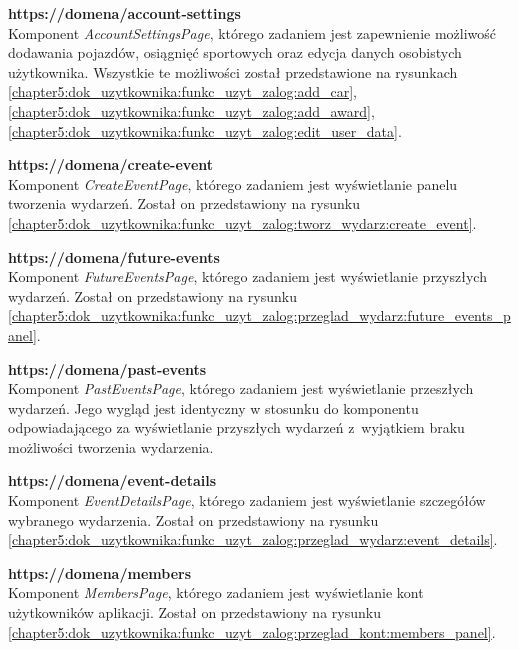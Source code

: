\documentclass[../Kamil_Kowalewski_Main.tex]{subfiles}
\begin{document}
{{{{                \noindent\textbf{https://domena/account-settings}\\
                \indent Komponent \textit{AccountSettingsPage}, którego zadaniem jest
                zapewnienie możliwość dodawania pojazdów, osiągnięć sportowych oraz edycja
                danych osobistych użytkownika. Wszystkie te możliwości został
                przedstawione na rysunkach
                \ref{chapter5:dok_uzytkownika:funkc_uzyt_zalog:add_car},
                \ref{chapter5:dok_uzytkownika:funkc_uzyt_zalog:add_award},
                \ref{chapter5:dok_uzytkownika:funkc_uzyt_zalog:edit_user_data}.

                \noindent\textbf{https://domena/create-event}\\
                \indent Komponent \textit{CreateEventPage}, którego zadaniem jest
                wyświetlanie panelu tworzenia wydarzeń. Został on przedstawiony na rysunku
                \ref{chapter5:dok_uzytkownika:funkc_uzyt_zalog:tworz_wydarz:create_event}.

                \noindent\textbf{https://domena/future-events}\\
                \indent Komponent \textit{FutureEventsPage}, którego zadaniem jest
                wyświetlanie przyszłych wydarzeń. Został on przedstawiony na rysunku
                \ref{chapter5:dok_uzytkownika:funkc_uzyt_zalog:przeglad_wydarz:future_events_panel}.

                \noindent\textbf{https://domena/past-events}\\
                \indent Komponent \textit{PastEventsPage}, którego zadaniem jest
                wyświetlanie przeszłych wydarzeń. Jego wygląd jest identyczny w
                stosunku do komponentu odpowiadającego za wyświetlanie przyszłych
                wydarzeń z~wyjątkiem braku możliwości tworzenia wydarzenia.

                \noindent\textbf{https://domena/event-details}\\
                \indent Komponent \textit{EventDetailsPage}, którego zadaniem jest
                wyświetlanie szczegółów wybranego wydarzenia. Został on przedstawiony
                na rysunku
                \ref{chapter5:dok_uzytkownika:funkc_uzyt_zalog:przeglad_wydarz:event_details}.

                \noindent\textbf{https://domena/members}\\
                \indent Komponent \textit{MembersPage}, którego zadaniem jest
                wyświetlanie kont użytkowników aplikacji. Został on przedstawiony na
                rysunku
                \ref{chapter5:dok_uzytkownika:funkc_uzyt_zalog:przeglad_kont:members_panel}.

}}}}
\end{document}
